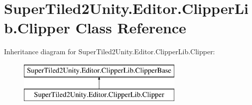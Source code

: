 \hypertarget{class_super_tiled2_unity_1_1_editor_1_1_clipper_lib_1_1_clipper}{}\section{Super\+Tiled2\+Unity.\+Editor.\+Clipper\+Lib.\+Clipper Class Reference}
\label{class_super_tiled2_unity_1_1_editor_1_1_clipper_lib_1_1_clipper}
Inheritance diagram for Super\+Tiled2\+Unity.\+Editor.\+Clipper\+Lib.\+Clipper\+:\begin{figure}[H]
\begin{center}
\leavevmode
\includegraphics[height=2.000000cm]{class_super_tiled2_unity_1_1_editor_1_1_clipper_lib_1_1_clipper}
\end{center}
\end{figure}

